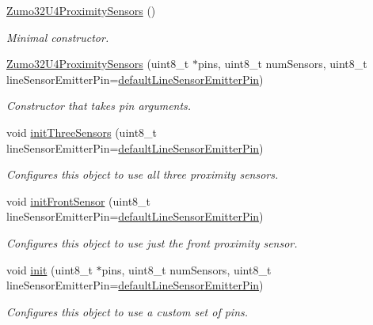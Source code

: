 \begin{DoxyCompactItemize}
\item 
\hyperlink{class_zumo32_u4_proximity_sensors_a73a7f00157adb39ba403649160f0f73b}{Zumo32\+U4\+Proximity\+Sensors} ()
\begin{DoxyCompactList}\small\item\em Minimal constructor. \end{DoxyCompactList}\item 
\hyperlink{class_zumo32_u4_proximity_sensors_a09d74928abeea79a5eed616655c1429e}{Zumo32\+U4\+Proximity\+Sensors} (uint8\+\_\+t $\ast$pins, uint8\+\_\+t num\+Sensors, uint8\+\_\+t line\+Sensor\+Emitter\+Pin=\hyperlink{class_zumo32_u4_proximity_sensors_a7d6a79ab499972b36c52d2a8c03fe0f7}{default\+Line\+Sensor\+Emitter\+Pin})
\begin{DoxyCompactList}\small\item\em Constructor that takes pin arguments. \end{DoxyCompactList}\item 
void \hyperlink{class_zumo32_u4_proximity_sensors_a521c7fe0992317c0566ff59ec132b469}{init\+Three\+Sensors} (uint8\+\_\+t line\+Sensor\+Emitter\+Pin=\hyperlink{class_zumo32_u4_proximity_sensors_a7d6a79ab499972b36c52d2a8c03fe0f7}{default\+Line\+Sensor\+Emitter\+Pin})
\begin{DoxyCompactList}\small\item\em Configures this object to use all three proximity sensors. \end{DoxyCompactList}\item 
void \hyperlink{class_zumo32_u4_proximity_sensors_abcc9c393f47cf994f06d9cae51369a6a}{init\+Front\+Sensor} (uint8\+\_\+t line\+Sensor\+Emitter\+Pin=\hyperlink{class_zumo32_u4_proximity_sensors_a7d6a79ab499972b36c52d2a8c03fe0f7}{default\+Line\+Sensor\+Emitter\+Pin})
\begin{DoxyCompactList}\small\item\em Configures this object to use just the front proximity sensor. \end{DoxyCompactList}\item 
void \hyperlink{class_zumo32_u4_proximity_sensors_a250ef26e66807bc800adc42be912fab5}{init} (uint8\+\_\+t $\ast$pins, uint8\+\_\+t num\+Sensors, uint8\+\_\+t line\+Sensor\+Emitter\+Pin=\hyperlink{class_zumo32_u4_proximity_sensors_a7d6a79ab499972b36c52d2a8c03fe0f7}{default\+Line\+Sensor\+Emitter\+Pin})
\begin{DoxyCompactList}\small\item\em Configures this object to use a custom set of pins. \end{DoxyCompactList}\item 

\end{DoxyCompactItemize}

